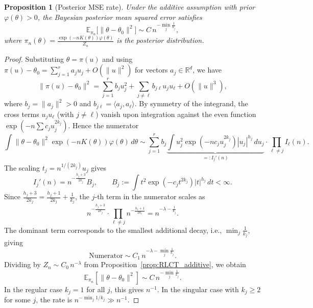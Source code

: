 \documentclass[10pt,a4paper]{amsart}
\newtheorem{proposition}{Proposition}
\begin{document}
\begin{proposition}[Posterior MSE rate]
\label{prop:posterior_MSE}
Under the additive assumption with prior $\varphi(\theta) > 0$, the Bayesian posterior mean squared error satisfies
\[
\mathbb{E}_{\pi_n} \big[ \|\theta - \theta_0\|^2 \big]
\sim
C \, n^{-\min_j \frac{1}{k_j}},
\]
where $\pi_n(\theta) = \frac{\exp(-nK(\theta))\varphi(\theta)}{Z_n}$ is the posterior distribution.
\end{proposition}

\begin{proof}
Substituting $\theta = \pi(u)$ and using $\pi(u) - \theta_0 = \sum_{j=1}^r a_j u_j + O(\|u\|^2)$ for vectors $a_j \in \mathbb{R}^d$, we have
\[
\|\pi(u) - \theta_0\|^2 = \sum_{j=1}^r b_j u_j^2 + \sum_{j \neq \ell} b_{j\ell} u_j u_\ell + O(\|u\|^3),
\]
where $b_j = \|a_j\|^2 > 0$ and $b_{j\ell} = \langle a_j, a_\ell \rangle$. By symmetry of the integrand, the cross terms $u_j u_\ell$ (with $j \neq \ell$) vanish upon integration against the even function $\exp(-n \sum c_j u_j^{2k_j})$. Hence the numerator
\[
\int \|\theta - \theta_0\|^2 \exp(-nK(\theta))\varphi(\theta)\,d\theta
\sim
\sum_{j=1}^r b_j \underbrace{\int u_j^2 \exp(-nc_j u_j^{2k_j}) |u_j|^{h_j}\,du_j}_{=:I_j'(n)} \cdot \prod_{\ell \neq j} I_\ell(n).
\]
The scaling $t_j = n^{1/(2k_j)}u_j$ gives
\[
I_j'(n) = n^{-\frac{h_j+3}{2k_j}} B_j,
\qquad
B_j := \int t^2 \exp(-c_j t^{2k_j})|t|^{h_j}\,dt < \infty.
\]
Since $\frac{h_j+3}{2k_j} = \frac{h_j+1}{2k_j} + \frac{1}{k_j}$, the $j$-th term in the numerator scales as
\[
n^{-\frac{h_j+3}{2k_j}} \cdot \prod_{\ell \neq j} n^{-\frac{h_\ell+1}{2k_\ell}} = n^{-\lambda - \frac{1}{k_j}}.
\]
The dominant term corresponds to the smallest additional decay, i.e., $\min_j \frac{1}{k_j}$, giving
\[
\text{Numerator} \sim C_1 \, n^{-\lambda - \min_j \frac{1}{k_j}}.
\]
Dividing by $Z_n \sim C_0 \, n^{-\lambda}$ from Proposition~\ref{prop:RLCT_additive}, we obtain
\[
\mathbb{E}_{\pi_n}[\|\theta - \theta_0\|^2] \sim C \, n^{-\min_j \frac{1}{k_j}}.
\]
In the regular case $k_j = 1$ for all $j$, this gives $n^{-1}$. In the singular case with $k_j \geq 2$ for some $j$, the rate is $n^{-\min_j 1/k_j} \gg n^{-1}$.
\end{proof}
\end{document}

